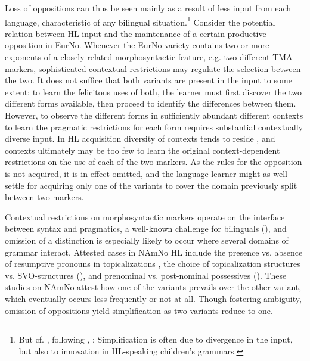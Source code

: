 \documentclass[output=paper]{langscibook}
\begin{document}
Loss of oppositions can thus be seen mainly as a result of less input from each language, characteristic of any bilingual situation.\footnote{But cf. \citet[15]{CorbetDominguez2020}, following \citet{CuzaMiller2015}, \citet{PolinskyScontras2020}: Simplification is often due to divergence in the input, but also to innovation in HL-speaking children’s grammars.} Consider the potential relation between HL input and the maintenance of a certain productive opposition in EurNo. Whenever the EurNo variety contains two or more exponents of a closely related morphosyntactic feature, e.g. two different TMA-markers, sophisticated contextual restrictions may regulate the selection between the two. It does not suffice that both variants are present in the input to some extent; to learn the felicitous uses of both, the learner must first discover the two different forms available, then proceed to identify the differences between them. However, to observe the different forms in sufficiently abundant different contexts to learn the pragmatic restrictions for each form requires substantial contextually diverse input. In HL acquisition diversity of contexts tends to reside \citep{GollanEtAl2015}, and contexts ultimately may be too few to learn the original context\hyp dependent restrictions on the use of each of the two markers. As the rules for the opposition is not acquired, it is in effect omitted, and the language learner might as well settle for acquiring only one of the variants to cover the domain previously split between two markers.

Contextual restrictions on morphosyntactic markers operate on the interface between syntax and pragmatics, a well-known challenge for  bilinguals (\citealt{Sorace2004, TsimpliSorace2006, SoraceSerratrice2009, Sorace2011}), and omission of a distinction is especially likely to occur where several domains of grammar interact. Attested cases in NAmNo HL include the presence vs. absence of resumptive pronouns in topicalizations \citep{BousquetteEtAl2021}, the choice of topicalization structures vs. SVO-structures (\citealt{EideHjelde2015Verb, WestergaardLohndal2019, BousquetteEtAl2021}), and prenominal vs. post-nominal possessives (\citealt{WestergaardAnderssen2015}). These studies on NAmNo attest how one of the variants prevails over the other variant, which eventually occurs less frequently or not at all. Though fostering ambiguity, omission of oppositions yield simplification as two variants reduce to one. 
\end{document}
